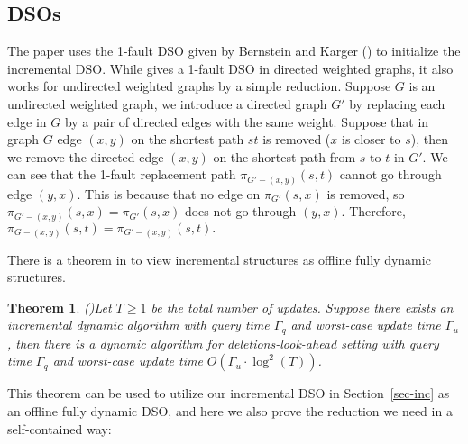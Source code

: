 \documentclass[11pt]{article}
\theoremstyle{plain}
\newtheorem{theorem}{Theorem}[section]
\theoremstyle{definition}
\begin{document}
\subsection{DSOs}\label{sec:intro-dso}

The paper uses the 1-fault DSO given by Bernstein and Karger (\cite{2009A}) to initialize the incremental DSO. While \cite{2009A} gives a 1-fault DSO in directed weighted graphs, it also works for undirected weighted graphs by a simple reduction. Suppose $G$ is an undirected weighted graph, we introduce a directed graph $G'$ by replacing each edge in $G$ by a pair of directed edges with the same weight. Suppose that in graph $G$ edge $(x,y)$ on the shortest path $st$ is removed ($x$ is closer to $s$), then we remove the directed edge $(x,y)$ on the shortest path from $s$ to $t$ in $G'.$ We can see that the 1-fault replacement path $\pi_{G'-(x,y)}(s,t)$ cannot go through edge $(y,x).$ This is because that no edge on $\pi_{G'}(s,x)$ is removed, so $\pi_{G'-(x,y)}(s,x)=\pi_{G'}(s,x)$ does not go through $(y,x).$ Therefore, $\pi_{G-(x,y)}(s,t)=\pi_{G'-(x,y)}(s,t).$ 





There is a theorem in \cite{peng2023fully} to view incremental structures as offline fully dynamic structures.

\begin{theorem} (\cite{peng2023fully})\label{thm1-2}
Let $T \geq 1$ be the total number of updates. Suppose there exists an incremental dynamic algorithm with query time $\Gamma_q$ and worst-case update time $\Gamma_u$, then there is a dynamic algorithm for deletions-look-ahead setting with query time $\Gamma_q$ and worst-case update time $O(\Gamma_u \cdot \log^2(T))$.
\end{theorem}

This theorem can be used to utilize our incremental DSO in Section~\ref{sec-inc} as an offline fully dynamic DSO, and here we also prove the reduction we need in a self-contained way:
\end{document}
